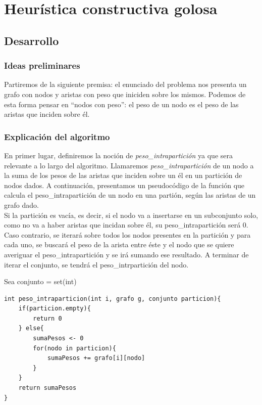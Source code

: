 \documentclass[10pt,a4paper]{article}
\begin{document}
\section{Heurística constructiva golosa}
\subsection{Desarrollo}
\subsubsection{Ideas preliminares}

Partiremos de la siguiente premisa: el enunciado del problema nos presenta un grafo con nodos y aristas con peso que iniciden sobre los mismos. Podemos de esta forma pensar en ``nodos con peso'': el peso de un nodo es el peso de las aristas que inciden sobre él.


\subsubsection{Explicación del algoritmo}

En primer lugar, definiremos la noción de \textit{peso\_intrapartición} ya que sera relevante a lo largo del algoritmo. 
Llamaremos \textit{peso\_intrapartición} de un nodo a la suma de los pesos de las aristas que inciden sobre un él en un partición de nodos dados.
A continuación, presentamos un pseudocódigo de la función que calcula el peso\_intrapartición de un nodo en una partión, según las aristas de un grafo dado.\\
Si la partición es vacía, es decir, si el nodo va a insertarse en un subconjunto solo, como no va a haber aristas que incidan sobre él, su peso\_intrapartición será 0.\\
Caso contrario, se iterará sobre todos los nodos presentes en la partición y para cada uno, se buscará el peso de la arista entre éste y el nodo que se quiere averiguar el peso\_intrapartición y se irá sumando ese resultado. A terminar de iterar el conjunto, se tendrá el peso\_intrpartición del nodo.

Sea conjunto = set(int)

\begin{lstlisting}
int peso_intraparticion(int i, grafo g, conjunto particion){
	if(particion.empty){
		return 0
	} else{
		sumaPesos <- 0
		for(nodo in particion){
			sumaPesos += grafo[i][nodo]
		}
	}
	return sumaPesos
}
\end{lstlisting}
\end{document}
